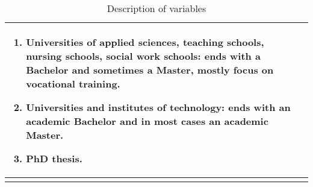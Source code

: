 \documentclass[12pt,a4paper]{article}
\begin{document}
\begin{longtable}{p{4cm}|p{10.5cm}}
\begin{enumerate}
			\item Universities of applied sciences, teaching schools, nursing schools, social work schools: ends with a Bachelor and sometimes a Master, mostly focus on vocational training.
			\item Universities and institutes of technology: ends with an academic Bachelor and in most cases an academic Master.
			\item PhD thesis.
		\end{enumerate}\\
	\hline
		\caption{Description of variables}
		\label{tab:variables}
	\end{longtable}

\clearpage


\end{document}
